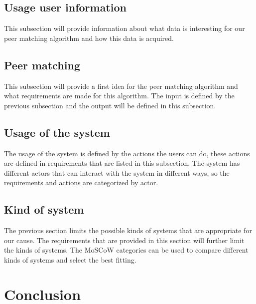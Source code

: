 \documentclass[]{article}
\begin{document}
\subsection{Usage user information}
This subsection will provide information about what data is interesting for our peer matching algorithm and how this data is acquired.

\subsection{Peer matching}
This subsection will provide a first idea for the peer matching algorithm and what requirements are made for this algorithm.
The input is defined by the previous subsection and the output will be defined in this subsection.

\subsection{Usage of the system}
The usage of the system is defined by the actions the users can do, these actions are defined in requirements that are listed in this subsection.
The system has different actors that can interact with the system in different ways, so the requirements and actions are categorized by actor.

\subsection{Kind of system}
The previous section limits the possible kinds of systems that are appropriate for our cause.
The requirements that are provided in this section will further limit the kinds of systems.
The MoSCoW categories can be used to compare different kinds of systems and select the best fitting.

\section{Conclusion}

\newpage


\end{document}
